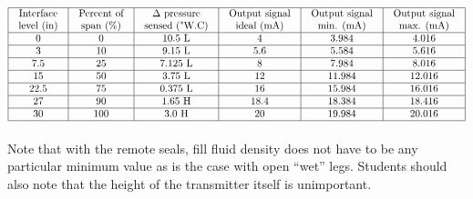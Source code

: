 
$$\vbox{\offinterlineskip
\halign{\strut
\vrule \quad\hfil # \ \hfil & 
\vrule \quad\hfil # \ \hfil & 
\vrule \quad\hfil # \ \hfil & 
\vrule \quad\hfil # \ \hfil & 
\vrule \quad\hfil # \ \hfil & 
\vrule \quad\hfil # \ \hfil \vrule \cr
\noalign{\hrule}
%
Interface & Percent of & $\Delta$ pressure & Output signal & Output signal & Output signal \cr
%
level (in) & span (\%) & sensed ("W.C) & ideal (mA) & min. (mA) & max. (mA) \cr
%
\noalign{\hrule}
%
0 & 0 & 10.5 L & 4 & 3.984 & 4.016 \cr
%
\noalign{\hrule}
%
3 & 10 & 9.15 L & 5.6 & 5.584 & 5.616 \cr
%
\noalign{\hrule}
%
7.5 & 25 & 7.125 L & 8 & 7.984 & 8.016 \cr
%
\noalign{\hrule}
%
15 & 50 & 3.75 L & 12 & 11.984 & 12.016 \cr
%
\noalign{\hrule}
%
22.5 & 75 & 0.375 L & 16 & 15.984 & 16.016 \cr
%
\noalign{\hrule}
%
27 & 90 & 1.65 H & 18.4 & 18.384 & 18.416 \cr
%
\noalign{\hrule}
%
30 & 100 & 3.0 H & 20 & 19.984 & 20.016 \cr
%
\noalign{\hrule}
} %
}$$ %

Note that with the remote seals, fill fluid density does not have to be any particular minimum value as is the case with open ``wet'' legs.  Students should also note that the height of the transmitter itself is unimportant.




